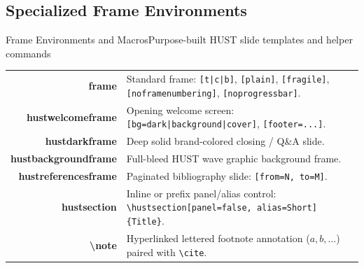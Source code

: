 \documentclass[aspectratio=43,10pt]{beamer}
\begin{document}
\subsection{Specialized Frame Environments}
\begin{frame}{Frame Environments and Macros}{Purpose-built HUST slide templates and helper commands}
  \scriptsize
  \centering
  \begin{tabularx}{\textwidth}{>{\ttfamily\bfseries\color{hustmain}}r >{\small\raggedright\arraybackslash}X}
    frame               & Standard frame: \texttt{[t|c|b]}, \texttt{[plain]}, \texttt{[fragile]}, \texttt{[noframenumbering]}, \texttt{[noprogressbar]}. \\
    hustwelcomeframe    & Opening welcome screen: \texttt{[bg=dark|background|cover]}, \texttt{[footer=...]}. \\
    hustdarkframe       & Deep solid brand-colored closing / Q\&A slide. \\
    hustbackgroundframe & Full-bleed HUST wave graphic background frame. \\
    hustreferencesframe & Paginated bibliography slide: \texttt{[from=N, to=M]}. \\
    hustsection         & Inline or prefix panel/alias control: \texttt{\textbackslash hustsection[panel=false, alias=Short]\{Title\}}. \\
    \textbackslash note & Hyperlinked lettered footnote annotation ($a, b, \dots$) paired with \texttt{\textbackslash cite}. \\
  \end{tabularx}
\end{frame}
\end{document}
